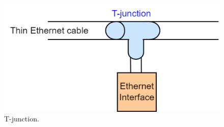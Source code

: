 \begin{figure}[h]
\centering
\includegraphics[scale=0.5]{Images/Layer2/t_junction}
\caption{\footnotesize{T-junction.}}\label{t_junction}
\end{figure}
